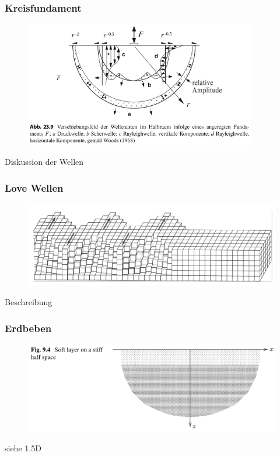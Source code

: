 \begin{frame}
\frametitle{Kreisfundament}
\begin{figure}
\includegraphics[width=0.9\textwidth]{fig_img/point_load_on_half_space} 
\caption*{\cite{Schmidt2017}}
\end{figure}
Diskussion der Wellen

\end{frame}


\begin{frame}
\frametitle{Love Wellen}
\begin{figure}
\includegraphics[width=\textwidth]{fig_img/love_wave} 
\caption*{\cite{Vrettos2017}}
\end{figure}
Beschreibung
\end{frame}


\begin{frame}
\frametitle{Erdbeben}
\begin{figure}
\includegraphics[width=\textwidth]{fig_img/love_wave_configuration} 
\caption*{\cite{Vrettos2017}}
\end{figure}

siehe 1.5D
\end{frame}



